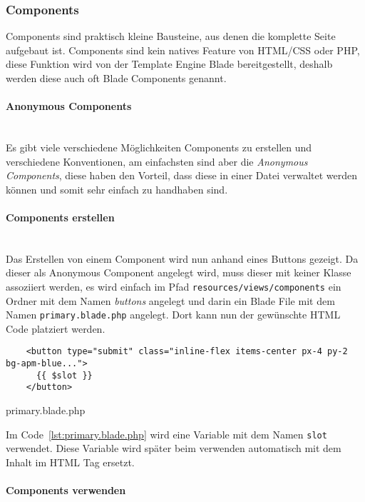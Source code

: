 \subsubsection{Components}

Components sind praktisch kleine Bausteine, aus denen die komplette Seite
aufgebaut ist. Components sind kein natives Feature von HTML/CSS oder PHP, diese
Funktion wird von der Template Engine Blade bereitgestellt, deshalb werden diese
auch oft Blade Components genannt. 

\paragraph{Anonymous Components}\mbox{}\\

Es gibt viele verschiedene Möglichkeiten Components zu erstellen und
verschiedene Konventionen, am einfachsten sind aber die \textit{Anonymous Components}, 
diese haben den Vorteil, dass diese in einer Datei verwaltet werden
können und somit sehr einfach zu handhaben sind.

\paragraph{Components erstellen}\mbox{}\\

Das Erstellen von einem Component wird nun anhand eines Buttons gezeigt. Da
dieser als Anonymous Component angelegt wird, muss dieser mit keiner Klasse
assoziiert werden, es wird einfach im Pfad \verb|resources/views/components| ein
Ordner mit dem Namen \textit{buttons} angelegt und darin ein Blade File mit dem
Namen \verb|primary.blade.php| angelegt. Dort kann nun der gewünschte HTML Code platziert
werden.

\begin{listing}[H]
  \begin{verbatim}
    <button type="submit" class="inline-flex items-center px-4 py-2 bg-apm-blue...">
      {{ $slot }}
    </button>
  \end{verbatim}
  \caption{primary.blade.php}
  \label{lst:primary.blade.php}
\end{listing}

Im Code~\ref{lst:primary.blade.php} wird eine Variable mit dem Namen \verb|slot|
verwendet. Diese Variable wird später beim verwenden automatisch mit dem
Inhalt im HTML Tag ersetzt.

\paragraph{Components verwenden}\mbox{}\\

